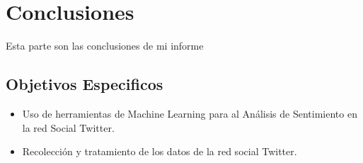 
\chapter{Conclusiones}
\label{intro}

Esta parte son las conclusiones de mi informe


\section{Objetivos Especificos}
\begin{itemize}
\item Uso de herramientas de Machine Learning para al Análisis de Sentimiento en la red Social Twitter.
\item  Recolecci\'on y tratamiento de los datos de la red social Twitter.
\end{itemize}


\cleardoublepage
